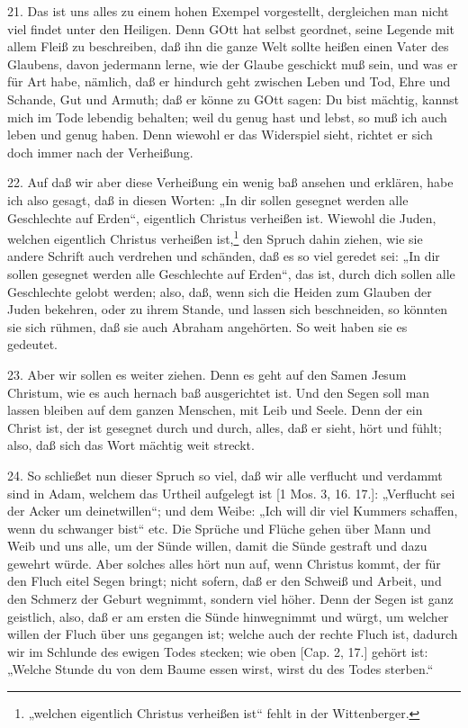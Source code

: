 21. Das ist uns alles zu einem hohen Exempel vorgestellt, dergleichen man nicht viel findet unter den Heiligen. Denn GOtt hat selbst geordnet, seine Legende mit allem Fleiß zu beschreiben, daß ihn die ganze Welt sollte heißen einen Vater des Glaubens, davon jedermann lerne, wie der Glaube geschickt muß sein, und was er für Art habe, nämlich, daß er hindurch geht zwischen Leben und Tod, Ehre und Schande, Gut und Armuth; daß er könne zu GOtt sagen: Du bist mächtig, kannst mich im Tode lebendig behalten; weil du genug hast und lebst, so muß ich auch leben und genug haben. Denn wiewohl er das Widerspiel sieht, richtet er sich doch immer nach der Verheißung.

22. Auf daß wir aber diese Verheißung ein wenig baß ansehen und erklären, habe ich also gesagt, daß in diesen Worten: „In dir sollen gesegnet werden alle Geschlechte auf Erden“, eigentlich Christus verheißen ist. Wiewohl die Juden, welchen eigentlich Christus verheißen ist,\footnote{„welchen eigentlich Christus verheißen ist“ fehlt in der Wittenberger.} den Spruch dahin ziehen, wie sie andere Schrift auch verdrehen und schänden, daß es so viel geredet sei: „In dir sollen gesegnet werden alle Geschlechte auf Erden“, das ist, durch dich sollen alle Geschlechte gelobt werden; also, daß, wenn sich die Heiden zum Glauben der Juden bekehren, oder zu ihrem Stande, und lassen sich beschneiden, so könnten sie sich rühmen, daß sie auch Abraham angehörten. So weit haben sie es gedeutet.

23. Aber wir sollen es weiter ziehen. Denn
es geht auf den Samen Jesum Christum, wie es auch hernach baß ausgerichtet ist. Und den Segen soll man lassen bleiben auf dem ganzen Menschen, mit Leib und Seele. Denn der ein Christ ist, der ist gesegnet durch und durch, alles, daß er sieht, hört und fühlt; also, daß sich das Wort mächtig weit streckt.

24. So schließet nun dieser Spruch so viel, daß wir alle verflucht und verdammt sind in Adam, welchem das Urtheil aufgelegt ist [1 Mos. 3, 16. 17.]: „Verflucht sei der Acker um deinetwillen“; und dem Weibe: „Ich will dir viel Kummers schaffen, wenn du schwanger bist“ etc. Die Sprüche und Flüche gehen über Mann und Weib und uns alle, um der Sünde willen, damit die Sünde gestraft und dazu gewehrt würde. Aber solches alles hört nun auf, wenn Christus kommt, der für den Fluch eitel Segen bringt; nicht sofern, daß er den Schweiß und Arbeit, und den Schmerz der Geburt wegnimmt, sondern viel höher. Denn der Segen ist ganz geistlich, also, daß er am ersten die Sünde hinwegnimmt und würgt, um welcher willen der Fluch über uns gegangen ist; welche auch der rechte Fluch ist, dadurch wir im Schlunde des ewigen Todes stecken; wie oben [Cap. 2, 17.] gehört ist: „Welche Stunde du von dem Baume essen wirst, wirst du des Todes sterben.“

